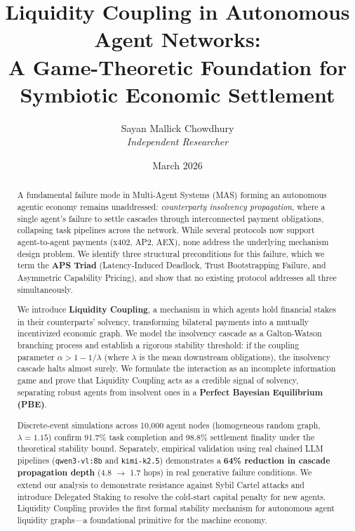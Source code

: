 \documentclass[11pt]{article}
\title{Liquidity Coupling in Autonomous Agent Networks: \\ A Game-Theoretic Foundation for Symbiotic Economic Settlement}
\author{Sayan Mallick Chowdhury \\ \textit{Independent Researcher}}
\date{March 2026}
\begin{document}
\maketitle

\begin{abstract}
A fundamental failure mode in Multi-Agent Systems (MAS) forming an autonomous agentic economy remains unaddressed: \textit{counterparty insolvency propagation}, where a single agent's failure to settle cascades through interconnected payment obligations, collapsing task pipelines across the network. While several protocols now support agent-to-agent payments (x402, AP2, AEX), none address the underlying mechanism design problem. We identify three structural preconditions for this failure, which we term the \textbf{APS Triad} (Latency-Induced Deadlock, Trust Bootstrapping Failure, and Asymmetric Capability Pricing), and show that no existing protocol addresses all three simultaneously.

We introduce \textbf{Liquidity Coupling}, a mechanism in which agents hold financial stakes in their counterparts' solvency, transforming bilateral payments into a mutually incentivized economic graph. We model the insolvency cascade as a Galton-Watson branching process and establish a rigorous stability threshold: if the coupling parameter $\alpha > 1 - 1/\lambda$ (where $\lambda$ is the mean downstream obligations), the insolvency cascade halts almost surely. We formulate the interaction as an incomplete information game and prove that Liquidity Coupling acts as a credible signal of solvency, separating robust agents from insolvent ones in a \textbf{Perfect Bayesian Equilibrium (PBE)}.

Discrete-event simulations across 10,000 agent nodes (homogeneous random graph, $\lambda=1.15$) confirm 91.7\% task completion and 98.8\% settlement finality under the theoretical stability bound. Separately, empirical validation using real chained LLM pipelines (\texttt{qwen3-vl:8b} and \texttt{kimi-k2.5}) demonstrates a \textbf{64\% reduction in cascade propagation depth} (4.8 $\to$ 1.7 hops) in real generative failure conditions. We extend our analysis to demonstrate resistance against Sybil Cartel attacks and introduce Delegated Staking to resolve the cold-start capital penalty for new agents. Liquidity Coupling provides the first formal stability mechanism for autonomous agent liquidity graphs---a foundational primitive for the machine economy.
\end{abstract}
\newpage
\end{document}
